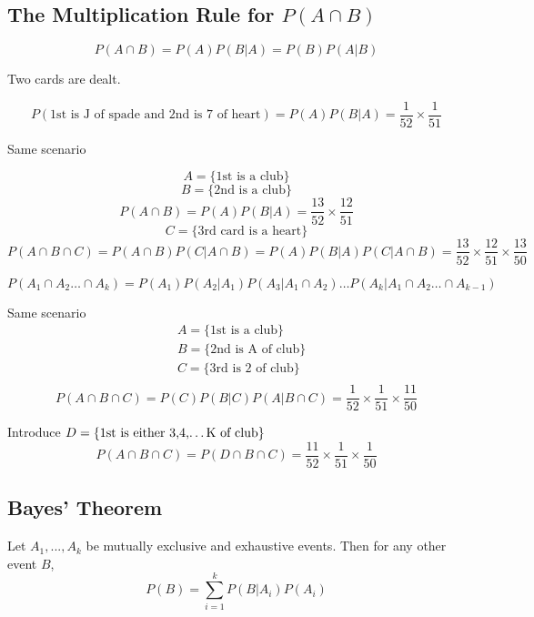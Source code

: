 \subsection{The Multiplication Rule for $P(A\cap B)$}
\begin{prop}
\[P(A \cap B)=P(A)P(B|A)=P(B)P(A|B)\]
\end{prop}

\begin{exmp}
Two cards are dealt.

\[P(\text{1st is J of spade and 2nd is 7 of heart})=P(A)P(B|A)=\frac{1}{52} \times \frac{1}{51}\]
\end{exmp}

\begin{exmp}
Same scenario

\[ A=\{\text{1st is a club}\} \]
\[ B=\{\text{2nd is a club}\}\]
\[P(A\cap B)=P(A)P(B|A)=\frac{13}{52} \times \frac{12}{51}\]
\[C=\{\text{3rd card is a heart}\} \]
\[P(A \cap B\cap C)=P(A\cap B)P(C|A \cap B)=P(A)P(B|A)P(C|A \cap B)=\frac{13}{52} \times \frac{12}{51} \times \frac{13}{50}\]
\end{exmp}

\begin{prop}
\[P(A_1 \cap A_2 \dots \cap A_k)=P(A_1)P(A_2|A_1)P(A_3|A_1\cap A_2)\dots P(A_k|A_1\cap A_2\dots\cap A_{k-1})\]
\end{prop}

\begin{exmp}
Same scenario
\begin{align*}
& A=\{\text{1st is a club}\} \\
& B=\{\text{2nd is A of club}\} \\
& C=\{\text{3rd is 2 of club}\} \\
\end{align*}
\[ P(A \cap B\cap C)=P(C)P(B|C)P(A|B\cap C)=\frac{1}{52}\times\frac{1}{51}\times\frac{11}{50} \]

Introduce $D=\{\text{1st is either 3,4,\dots K of club}\}$
\[P(A \cap B\cap C)=P(D\cap B\cap C)=\frac{11}{52}\times\frac{1}{51}\times\frac{1}{50}\]
\end{exmp}

\subsection{Bayes' Theorem}
\begin{theo}  
  Let $A_1, . . . , A_k$ be mutually exclusive and exhaustive events. Then for any other event $B$,
  \[ P(B)=\sum_{i=1}^{k} P(B|A_i)P(A_i)\]
\end{theo}

